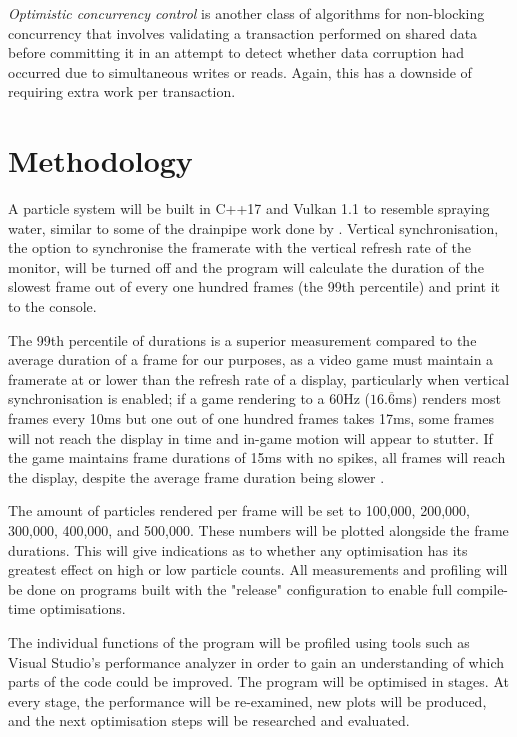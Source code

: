 \documentclass[11pt, a4paper, twocolumn]{article}
\begin{document}
\emph{Optimistic concurrency control} is another class of algorithms for non-blocking concurrency that involves validating a transaction performed on shared data before committing it \citep{Herlihy1993} in an attempt to detect whether data corruption had occurred due to simultaneous writes or reads. Again, this has a downside of requiring extra work per transaction.

\section{Methodology}

A particle system will be built in C++17 and Vulkan 1.1 to resemble spraying water, similar to some of the drainpipe work done by \citet{Tatarchuk2006}. Vertical synchronisation, the option to synchronise the framerate with the vertical refresh rate of the monitor, will be turned off and the program will calculate the duration of the slowest frame out of every one hundred frames (the 99th percentile) and print it to the console.

The 99th percentile of durations is a superior measurement compared to the average duration of a frame for our purposes, as a video game must maintain a framerate at or lower than the refresh rate of a display, particularly when vertical synchronisation is enabled; if a game rendering to a 60Hz ($16.\overline{6}$ms) renders most frames every 10ms but one out of one hundred frames takes 17ms, some frames will not reach the display in time and in-game motion will appear to stutter. If the game maintains frame durations of 15ms with no spikes, all frames will reach the display, despite the average frame duration being slower \citep{IntelFrameTime}.

The amount of particles rendered per frame will be set to 100,000, 200,000, 300,000, 400,000, and 500,000. These numbers will be plotted alongside the frame durations. This will give indications as to whether any optimisation has its greatest effect on high or low particle counts. All measurements and profiling will be done on programs built with the "release" configuration to enable full compile-time optimisations.

The individual functions of the program will be profiled using tools such as Visual Studio's performance analyzer \citep{VSPerfTools} in order to gain an understanding of which parts of the code could be improved. The program will be optimised in stages. At every stage, the performance will be re-examined, new plots will be produced, and the next optimisation steps will be researched and evaluated.
\end{document}
